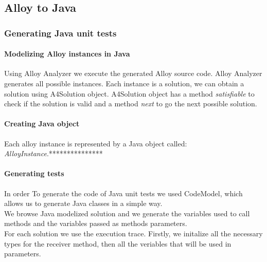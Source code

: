 \subsection{Alloy to Java}
\subsubsection{Generating Java unit tests}
\paragraph{Modelizing Alloy instances in Java}
Using Alloy Analyzer we execute the generated Alloy source code. Alloy Analyzer generates all possible instances.
Each instance is a solution, we can obtain a solution using A4Solution object. A4Solution object has a method \textit{satisfiable} to check if the solution is valid and a method \textit{next} to go the next possible solution.

\paragraph{Creating Java object}
Each alloy instance is represented by a Java object called: \textit{AlloyInstance}.***************

\paragraph{Generating tests}
In order To generate the code of Java unit tests we used CodeModel, which allows us to generate Java classes in a simple way.\\
We browse Java modelized solution and we generate the variables used to call methods and the variables passed as methods parameters.\\
For each solution we use the execution trace.
Firstly, we initalize all the necessary types for the receiver method, then all the veriables that will be used in parameters.

